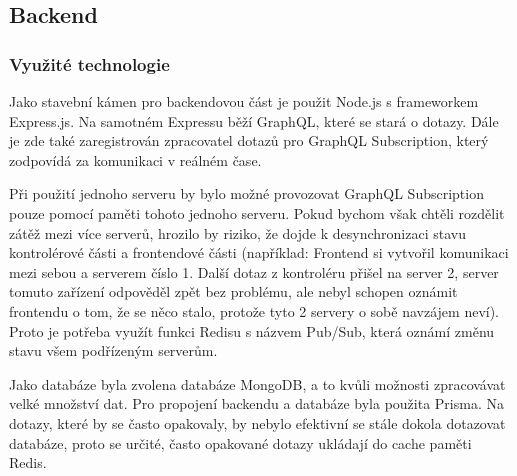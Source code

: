 \subsection{Backend}

\subsubsection{Využité technologie}
Jako stavební kámen pro backendovou část je použit Node.js s frameworkem Express.js. Na samotném Expressu běží GraphQL, které se stará o dotazy. Dále je zde také zaregistrován zpracovatel dotazů pro GraphQL Subscription, který zodpovídá za komunikaci v reálném čase.\par
Při použití jednoho serveru by bylo možné provozovat GraphQL Subscription pouze pomocí paměti tohoto jednoho serveru. Pokud bychom však chtěli rozdělit zátěž mezi více serverů, hrozilo by riziko, že dojde k desynchronizaci stavu kontrolérové části a frontendové části (například: Frontend si vytvořil komunikaci mezi sebou a serverem číslo 1. Další dotaz z kontroléru přišel na server 2, server tomuto zařízení odpověděl zpět bez problému, ale nebyl schopen oznámit frontendu o tom, že se něco stalo, protože tyto 2 servery o sobě navzájem neví). Proto je potřeba využít funkci Redisu s názvem Pub/Sub\cite{PubSub}, která oznámí změnu stavu všem podřízeným serverům.\par
Jako databáze byla zvolena databáze MongoDB, a to kvůli možnosti zpracovávat velké množství dat. Pro propojení backendu a databáze byla použita Prisma. Na dotazy, které by se často opakovaly, by nebylo efektivní se stále dokola dotazovat databáze, proto se určité, často opakované dotazy ukládají do cache paměti Redis.\par

